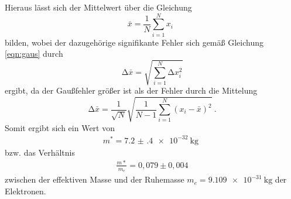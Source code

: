 
Hieraus lässt sich der Mittelwert über die Gleichung
\begin{equation}
  \bar{x} = \frac{1}{N} \sum_{i=1}^{N} x_i \: \:
  \label{eqn:mit}
\end{equation}
\noindent bilden, wobei der dazugehörige signifikante Fehler sich gemäß Gleichung \eqref{eqn:gaus} durch
\begin{equation}
  \increment \bar{x} = \sqrt{\sum_{i=1}^N \increment x_i^2}
  \label{eqn:mitf}
\end{equation}
ergibt, da der Gaußfehler größer ist als der Fehler durch die Mittelung
\begin{equation}
  \increment \bar{x} = \frac{1}{\sqrt{N}} \sqrt{ \frac{1}{N-1} \sum_{i=1}^N
  (x_i - \bar{x})^2} \: .
  \label{eqn:mitf}
\end{equation}
Somit ergibt sich ein Wert von
\begin{align*}
  m^*=\SI{7.2(4)e-32}{\kilo\gram} \: \,
\end{align*}
bzw. das Verhältnis
\begin{align*}
  \frac{m*}{m_e}=0,079\pm0,004
\end{align*}
zwischen der effektiven Masse und der Ruhemasse $m_e=\SI{9.109e-31}{\kilo\gram}$ der Elektronen.

